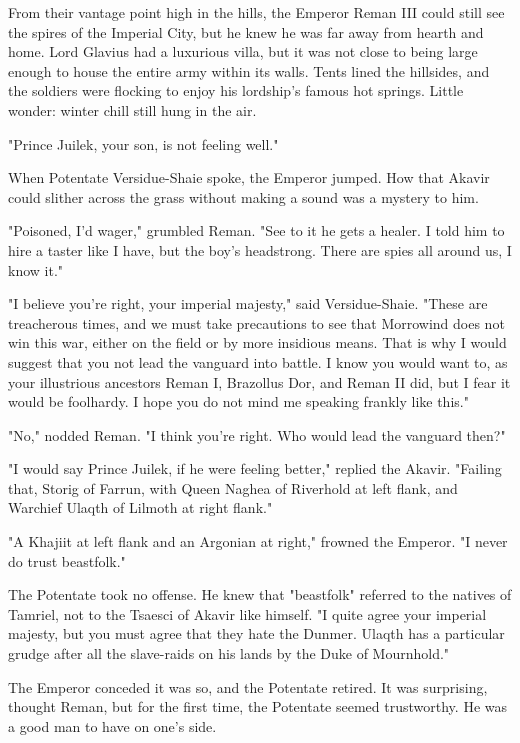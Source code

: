 \clearpage
{}

\dropcap From their vantage point high in the hills, the Emperor Reman III could still see the spires of the Imperial City, but he knew he was far away from hearth and home. Lord Glavius had a luxurious villa, but it was not close to being large enough to house the entire army within its walls. Tents lined the hillsides, and the soldiers were flocking to enjoy his lordship's famous hot springs. Little wonder: winter chill still hung in the air.

"Prince Juilek, your son, is not feeling well."

When Potentate Versidue-Shaie spoke, the Emperor jumped. How that Akavir could slither across the grass without making a sound was a mystery to him.

"Poisoned, I'd wager," grumbled Reman. "See to it he gets a healer. I told him to hire a taster like I have, but the boy's headstrong. There are spies all around us, I know it."

"I believe you're right, your imperial majesty," said Versidue-Shaie. "These are treacherous times, and we must take precautions to see that Morrowind does not win this war, either on the field or by more insidious means. That is why I would suggest that you not lead the vanguard into battle. I know you would want to, as your illustrious ancestors Reman I, Brazollus Dor, and Reman II did, but I fear it would be foolhardy. I hope you do not mind me speaking frankly like this."

"No," nodded Reman. "I think you're right. Who would lead the vanguard then?"

"I would say Prince Juilek, if he were feeling better," replied the Akavir. "Failing that, Storig of Farrun, with Queen Naghea of Riverhold at left flank, and Warchief Ulaqth of Lilmoth at right flank."

"A Khajiit at left flank and an Argonian at right," frowned the Emperor. "I never do trust beastfolk."

The Potentate took no offense. He knew that "beastfolk" referred to the natives of Tamriel, not to the Tsaesci of Akavir like himself. "I quite agree your imperial majesty, but you must agree that they hate the Dunmer. Ulaqth has a particular grudge after all the slave-raids on his lands by the Duke of Mournhold."

The Emperor conceded it was so, and the Potentate retired. It was surprising, thought Reman, but for the first time, the Potentate seemed trustworthy. He was a good man to have on one's side.

